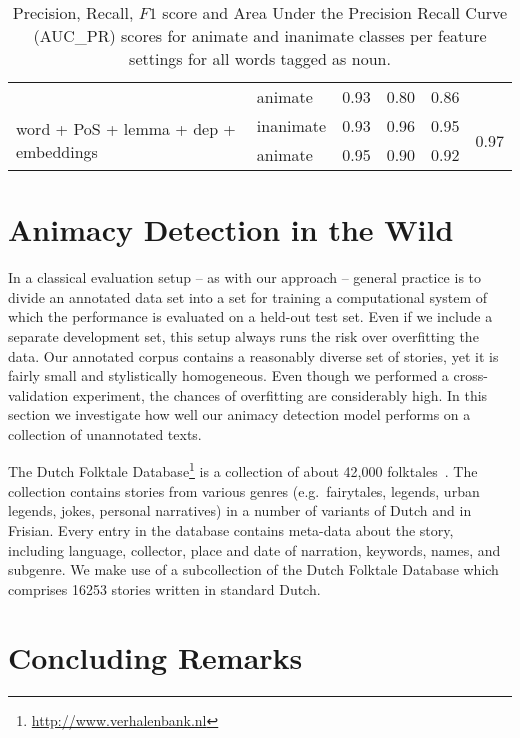 \documentclass[a4paper,UKenglish]{oasics}
\begin{document}
\begin{table}
\begin{tabular}{llrrrr}
                                                       & animate       &       0.93 &    0.80 &    0.86 &  \\
\multirow{2}{*}{word + PoS + lemma + dep + embeddings} & inanimate     &       0.93 &    0.96 &    0.95 & \multirow{2}{*}{0.97} \\
                                                       & animate       &       0.95 &    0.90 &    0.92 &  \\
\bottomrule
\end{tabular}
\caption{Precision, Recall, $F1$ score and Area Under the Precision Recall Curve (AUC_{PR}) scores for animate and inanimate classes
  per feature settings for all words tagged as noun.}
\label{tab:results-noun}
\end{table}


\section{Animacy Detection in the Wild}

In a classical evaluation setup -- as with our approach -- general
practice is to divide an annotated data set into a set for training a
computational system of which the performance is evaluated on a
held-out test set. Even if we include a separate development set, this
setup always runs the risk over overfitting the data. Our annotated
corpus contains a reasonably diverse set of stories, yet it is fairly
small and stylistically homogeneous. Even though we performed a
cross-validation experiment, the chances of overfitting are
considerably high. In this section we investigate how well our animacy
detection model performs on a collection of unannotated texts.

The Dutch Folktale Database\footnote{\url{http://www.verhalenbank.nl}}
is a collection of about 42,000 folktales~\cite{meder:10}. The
collection contains stories from various genres (e.g.~fairytales,
legends, urban legends, jokes, personal narratives) in a number of
variants of Dutch and in Frisian. Every entry in the database contains
meta-data about the story, including language, collector, place and
date of narration, keywords, names, and subgenre. We make use of a
subcollection of the Dutch Folktale Database which comprises 16253
stories written in standard Dutch.

\section{Concluding Remarks}
\end{document}
